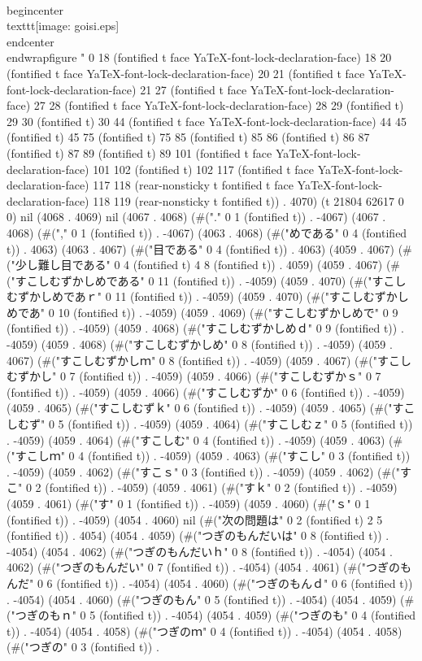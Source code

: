  \\begin{center}
  \\texttt{[image: goisi.eps]}
  \\end{center}
\\end{wrapfigure}
" 0 18 (fontified t face YaTeX-font-lock-declaration-face) 18 20 (fontified t face YaTeX-font-lock-declaration-face) 20 21 (fontified t face YaTeX-font-lock-declaration-face) 21 27 (fontified t face YaTeX-font-lock-declaration-face) 27 28 (fontified t face YaTeX-font-lock-declaration-face) 28 29 (fontified t) 29 30 (fontified t) 30 44 (fontified t face YaTeX-font-lock-declaration-face) 44 45 (fontified t) 45 75 (fontified t) 75 85 (fontified t) 85 86 (fontified t) 86 87 (fontified t) 87 89 (fontified t) 89 101 (fontified t face YaTeX-font-lock-declaration-face) 101 102 (fontified t) 102 117 (fontified t face YaTeX-font-lock-declaration-face) 117 118 (rear-nonsticky t fontified t face YaTeX-font-lock-declaration-face) 118 119 (rear-nonsticky t fontified t)) . 4070) (t 21804 62617 0 0) nil (4068 . 4069) nil (4067 . 4068) (#("." 0 1 (fontified t)) . -4067) (4067 . 4068) (#("," 0 1 (fontified t)) . -4067) (4063 . 4068) (#("めである" 0 4 (fontified t)) . 4063) (4063 . 4067) (#("目である" 0 4 (fontified t)) . 4063) (4059 . 4067) (#("少し難し目である" 0 4 (fontified t) 4 8 (fontified t)) . 4059) (4059 . 4067) (#("すこしむずかしめである" 0 11 (fontified t)) . -4059) (4059 . 4070) (#("すこしむずかしめであｒ" 0 11 (fontified t)) . -4059) (4059 . 4070) (#("すこしむずかしめであ" 0 10 (fontified t)) . -4059) (4059 . 4069) (#("すこしむずかしめで" 0 9 (fontified t)) . -4059) (4059 . 4068) (#("すこしむずかしめｄ" 0 9 (fontified t)) . -4059) (4059 . 4068) (#("すこしむずかしめ" 0 8 (fontified t)) . -4059) (4059 . 4067) (#("すこしむずかしｍ" 0 8 (fontified t)) . -4059) (4059 . 4067) (#("すこしむずかし" 0 7 (fontified t)) . -4059) (4059 . 4066) (#("すこしむずかｓ" 0 7 (fontified t)) . -4059) (4059 . 4066) (#("すこしむずか" 0 6 (fontified t)) . -4059) (4059 . 4065) (#("すこしむずｋ" 0 6 (fontified t)) . -4059) (4059 . 4065) (#("すこしむず" 0 5 (fontified t)) . -4059) (4059 . 4064) (#("すこしむｚ" 0 5 (fontified t)) . -4059) (4059 . 4064) (#("すこしむ" 0 4 (fontified t)) . -4059) (4059 . 4063) (#("すこしｍ" 0 4 (fontified t)) . -4059) (4059 . 4063) (#("すこし" 0 3 (fontified t)) . -4059) (4059 . 4062) (#("すこｓ" 0 3 (fontified t)) . -4059) (4059 . 4062) (#("すこ" 0 2 (fontified t)) . -4059) (4059 . 4061) (#("すｋ" 0 2 (fontified t)) . -4059) (4059 . 4061) (#("す" 0 1 (fontified t)) . -4059) (4059 . 4060) (#("ｓ" 0 1 (fontified t)) . -4059) (4054 . 4060) nil (#("次の問題は" 0 2 (fontified t) 2 5 (fontified t)) . 4054) (4054 . 4059) (#("つぎのもんだいは" 0 8 (fontified t)) . -4054) (4054 . 4062) (#("つぎのもんだいｈ" 0 8 (fontified t)) . -4054) (4054 . 4062) (#("つぎのもんだい" 0 7 (fontified t)) . -4054) (4054 . 4061) (#("つぎのもんだ" 0 6 (fontified t)) . -4054) (4054 . 4060) (#("つぎのもんｄ" 0 6 (fontified t)) . -4054) (4054 . 4060) (#("つぎのもん" 0 5 (fontified t)) . -4054) (4054 . 4059) (#("つぎのもｎ" 0 5 (fontified t)) . -4054) (4054 . 4059) (#("つぎのも" 0 4 (fontified t)) . -4054) (4054 . 4058) (#("つぎのｍ" 0 4 (fontified t)) . -4054) (4054 . 4058) (#("つぎの" 0 3 (fontified t)) . 
